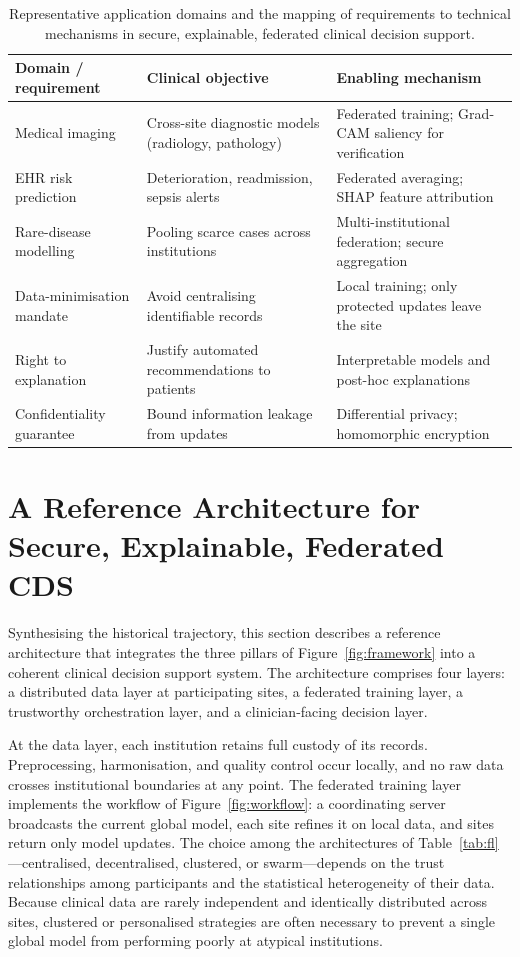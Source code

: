 \documentclass[11pt,a4paper]{article}
\begin{document}
\begin{table}[t]
  \centering
  \caption{Representative application domains and the mapping of requirements to
  technical mechanisms in secure, explainable, federated clinical decision
  support.}
  \label{tab:apps}
  \small
  \begin{tabularx}{\textwidth}{@{}l X X@{}}
    \toprule
    \textbf{Domain / requirement} & \textbf{Clinical objective} & \textbf{Enabling mechanism} \\
    \midrule
    Medical imaging & Cross-site diagnostic models (radiology, pathology) & Federated training; Grad-CAM saliency for verification \\
    EHR risk prediction & Deterioration, readmission, sepsis alerts & Federated averaging; SHAP feature attribution \\
    Rare-disease modelling & Pooling scarce cases across institutions & Multi-institutional federation; secure aggregation \\
    Data-minimisation mandate & Avoid centralising identifiable records & Local training; only protected updates leave the site \\
    Right to explanation & Justify automated recommendations to patients & Interpretable models and post-hoc explanations \\
    Confidentiality guarantee & Bound information leakage from updates & Differential privacy; homomorphic encryption \\
    \bottomrule
  \end{tabularx}
\end{table}

\section{A Reference Architecture for Secure, Explainable, Federated CDS}
Synthesising the historical trajectory, this section describes a reference
architecture that integrates the three pillars of Figure~\ref{fig:framework} into
a coherent clinical decision support system. The architecture comprises four
layers: a distributed data layer at participating sites, a federated training
layer, a trustworthy orchestration layer, and a clinician-facing decision layer.

At the data layer, each institution retains full custody of its records.
Preprocessing, harmonisation, and quality control occur locally, and no raw data
crosses institutional boundaries at any point. The federated training layer
implements the workflow of Figure~\ref{fig:workflow}: a coordinating server
broadcasts the current global model, each site refines it on local data, and
sites return only model updates. The choice among the architectures of
Table~\ref{tab:fl}---centralised, decentralised, clustered, or swarm---depends on
the trust relationships among participants and the statistical heterogeneity of
their data. Because clinical data are rarely independent and identically
distributed across sites, clustered or personalised strategies are often
necessary to prevent a single global model from performing poorly at atypical
institutions.
\end{document}
